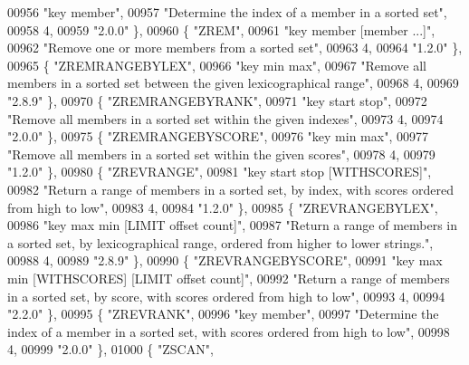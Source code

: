 \begin{DoxyCode}
00956     \textcolor{stringliteral}{"key member"},
00957     \textcolor{stringliteral}{"Determine the index of a member in a sorted set"},
00958     4,
00959     \textcolor{stringliteral}{"2.0.0"} \},
00960     \{ \textcolor{stringliteral}{"ZREM"},
00961     \textcolor{stringliteral}{"key member [member ...]"},
00962     \textcolor{stringliteral}{"Remove one or more members from a sorted set"},
00963     4,
00964     \textcolor{stringliteral}{"1.2.0"} \},
00965     \{ \textcolor{stringliteral}{"ZREMRANGEBYLEX"},
00966     \textcolor{stringliteral}{"key min max"},
00967     \textcolor{stringliteral}{"Remove all members in a sorted set between the given lexicographical range"},
00968     4,
00969     \textcolor{stringliteral}{"2.8.9"} \},
00970     \{ \textcolor{stringliteral}{"ZREMRANGEBYRANK"},
00971     \textcolor{stringliteral}{"key start stop"},
00972     \textcolor{stringliteral}{"Remove all members in a sorted set within the given indexes"},
00973     4,
00974     \textcolor{stringliteral}{"2.0.0"} \},
00975     \{ \textcolor{stringliteral}{"ZREMRANGEBYSCORE"},
00976     \textcolor{stringliteral}{"key min max"},
00977     \textcolor{stringliteral}{"Remove all members in a sorted set within the given scores"},
00978     4,
00979     \textcolor{stringliteral}{"1.2.0"} \},
00980     \{ \textcolor{stringliteral}{"ZREVRANGE"},
00981     \textcolor{stringliteral}{"key start stop [WITHSCORES]"},
00982     \textcolor{stringliteral}{"Return a range of members in a sorted set, by index, with scores ordered from high to low"},
00983     4,
00984     \textcolor{stringliteral}{"1.2.0"} \},
00985     \{ \textcolor{stringliteral}{"ZREVRANGEBYLEX"},
00986     \textcolor{stringliteral}{"key max min [LIMIT offset count]"},
00987     \textcolor{stringliteral}{"Return a range of members in a sorted set, by lexicographical range, ordered from higher to lower
       strings."},
00988     4,
00989     \textcolor{stringliteral}{"2.8.9"} \},
00990     \{ \textcolor{stringliteral}{"ZREVRANGEBYSCORE"},
00991     \textcolor{stringliteral}{"key max min [WITHSCORES] [LIMIT offset count]"},
00992     \textcolor{stringliteral}{"Return a range of members in a sorted set, by score, with scores ordered from high to low"},
00993     4,
00994     \textcolor{stringliteral}{"2.2.0"} \},
00995     \{ \textcolor{stringliteral}{"ZREVRANK"},
00996     \textcolor{stringliteral}{"key member"},
00997     \textcolor{stringliteral}{"Determine the index of a member in a sorted set, with scores ordered from high to low"},
00998     4,
00999     \textcolor{stringliteral}{"2.0.0"} \},
01000     \{ \textcolor{stringliteral}{"ZSCAN"},

\end{DoxyCode}
